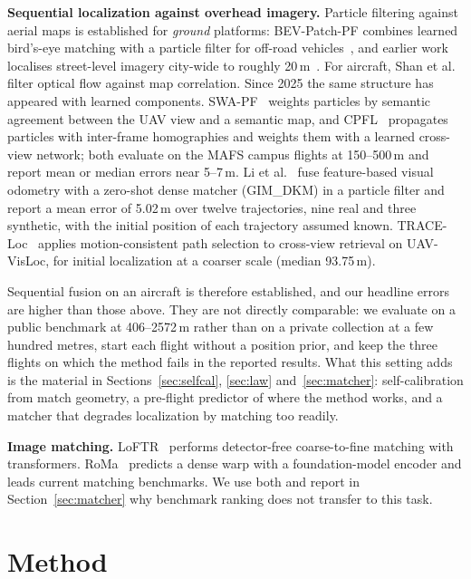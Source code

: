 \documentclass[conference]{IEEEtran}
\begin{document}
\textbf{Sequential localization against overhead imagery.} Particle filtering
against aerial maps is established for \emph{ground} platforms: BEV-Patch-PF
combines learned bird's-eye matching with a particle filter for off-road
vehicles~\cite{bevpatchpf}, and earlier work localises street-level imagery
city-wide to roughly 20\,m~\cite{downes}. For aircraft, Shan et
al.~\cite{shan} filter optical flow against map correlation. Since 2025 the
same structure has appeared with learned components. SWA-PF~\cite{swapf}
weights particles by semantic agreement between the UAV view and a semantic
map, and CPFL~\cite{cpfl} propagates particles with inter-frame homographies
and weights them with a learned cross-view network; both evaluate on the MAFS
campus flights at 150--500\,m and report mean or median errors near 5--7\,m.
Li et al.~\cite{gimpf} fuse feature-based visual odometry with a zero-shot
dense matcher (GIM\_DKM) in a particle filter and report a mean error of
5.02\,m over twelve trajectories, nine real and three synthetic, with the
initial position of each trajectory assumed known. TRACE-Loc~\cite{traceloc}
applies motion-consistent path selection to cross-view retrieval on
UAV-VisLoc, for initial localization at a coarser scale (median 93.75\,m).

Sequential fusion on an aircraft is therefore established, and our headline
errors are higher than those above. They are not directly comparable: we
evaluate on a public benchmark at 406--2572\,m rather than on a private
collection at a few hundred metres, start each flight without a position
prior, and keep the three flights on which the method fails in the reported
results. What this setting adds is the material in Sections~\ref{sec:selfcal},
\ref{sec:law} and~\ref{sec:matcher}: self-calibration from match geometry, a
pre-flight predictor of where the method works, and a matcher that degrades
localization by matching too readily.

\textbf{Image matching.} LoFTR~\cite{loftr} performs detector-free coarse-to-fine
matching with transformers. RoMa~\cite{roma} predicts a dense warp with a
foundation-model encoder and leads current matching benchmarks. We use both
and report in Section~\ref{sec:matcher} why benchmark ranking does not transfer
to this task.

\section{Method}
\end{document}
